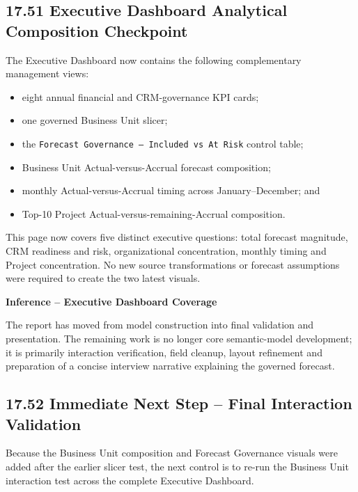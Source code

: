 \documentclass[11pt,a4paper]{article}
\begin{document}
\subsection{17.51 Executive Dashboard Analytical Composition Checkpoint}

The Executive Dashboard now contains the following complementary management views:

\begin{itemize}[leftmargin=7mm,itemsep=2pt]
    \item eight annual financial and CRM-governance KPI cards;
    \item one governed Business Unit slicer;
    \item the \texttt{Forecast Governance -- Included vs At Risk} control table;
    \item Business Unit Actual-versus-Accrual forecast composition;
    \item monthly Actual-versus-Accrual timing across January--December; and
    \item Top-10 Project Actual-versus-remaining-Accrual composition.
\end{itemize}

This page now covers five distinct executive questions: total forecast magnitude,
CRM readiness and risk, organizational concentration, monthly timing and Project
concentration. No new source transformations or forecast assumptions were required
to create the two latest visuals.

\begin{inferencebox}

\textbf{Inference -- Executive Dashboard Coverage}

The report has moved from model construction into final validation and presentation.
The remaining work is no longer core semantic-model development; it is primarily
interaction verification, field cleanup, layout refinement and preparation of a
concise interview narrative explaining the governed forecast.

\end{inferencebox}


\subsection{17.52 Immediate Next Step -- Final Interaction Validation}

Because the Business Unit composition and Forecast Governance visuals were added
after the earlier slicer test, the next control is to re-run the Business Unit
interaction test across the complete Executive Dashboard.
\end{document}
